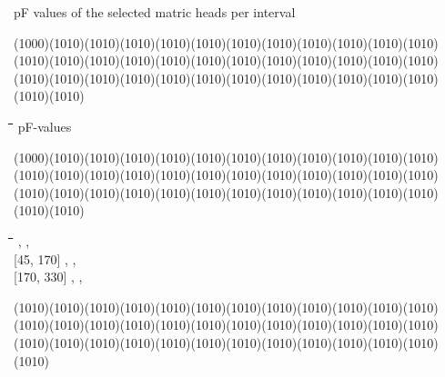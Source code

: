 \documentclass[11pt]{article}
\begin{document}
\begin{indenting}{2.54cm}
pF values of the selected matric heads per interval
\end{indenting}
\GrBox(1000)\GrBox(1010)\GrBox(1010)\GrBox(1010)\GrBox(1010)\GrBox(1010)\GrBox(1010)\GrBox(1010)\GrBox(1010)\GrBox(1010)\GrBox(1010)\GrBox(1010)\GrBox(1010)\GrBox(1010)\GrBox(1010)\GrBox(1010)\GrBox(1010)\GrBox(1010)\GrBox(1010)\GrBox(1010)\GrBox(1010)\GrBox(1010)\GrBox(1010)\GrBox(1010)\GrBox(1010)\GrBox(1010)\GrBox(1010)\GrBox(1010)\GrBox(1010)\GrBox(1010)\GrBox(1010)\GrBox(1010)\GrBox(1010)\GrBox(1010)\GrBox(1010)\GrBox(1010)\GrBox(1010)\GrBox(1010)\nwln
\begin{tabbing}
\hspace{1.27cm}\=\hspace{1.27cm}\=\hspace{1.27cm}\=\hspace{1.27cm}\=%
\hspace{1.27cm}\=\hspace{1.27cm}\=\hspace{1.27cm}\=\hspace{1.27cm}\=%
\hspace{1.27cm}\=\hspace{1.27cm}\=\kill
\>\> \> \> \> \> pF-values
\end{tabbing}
\GrBox(1000)\GrBox(1010)\GrBox(1010)\GrBox(1010)\GrBox(1010)\GrBox(1010)\GrBox(1010)\GrBox(1010)\GrBox(1010)\GrBox(1010)\GrBox(1010)\GrBox(1010)\GrBox(1010)\GrBox(1010)\GrBox(1010)\GrBox(1010)\GrBox(1010)\GrBox(1010)\GrBox(1010)\GrBox(1010)\GrBox(1010)\GrBox(1010)\GrBox(1010)\GrBox(1010)\GrBox(1010)\GrBox(1010)\GrBox(1010)\GrBox(1010)\GrBox(1010)\GrBox(1010)\GrBox(1010)\GrBox(1010)\GrBox(1010)\GrBox(1010)\GrBox(1010)\GrBox(1010)\GrBox(1010)\GrBox(1010)\nwln
\begin{tabbing}
\hspace{1.27cm}\=\hspace{1.27cm}\=\hspace{1.27cm}\=\hspace{1.27cm}\=%
\hspace{1.27cm}\=\hspace{1.27cm}\=\hspace{1.27cm}\=\hspace{1.27cm}\=%
\hspace{1.27cm}\=\hspace{1.27cm}\=\kill
[0, 45]\> \> ,\> \>  , \> \>     \\
{}[45, 170]\> \> , \> \> ,\> \>      \\
{}[170, 330]\> \> ,\> \>  , \> \>     
\end{tabbing}
\GrBox(1010)\GrBox(1010)\GrBox(1010)\GrBox(1010)\GrBox(1010)\GrBox(1010)\GrBox(1010)\GrBox(1010)\GrBox(1010)\GrBox(1010)\GrBox(1010)\GrBox(1010)\GrBox(1010)\GrBox(1010)\GrBox(1010)\GrBox(1010)\GrBox(1010)\GrBox(1010)\GrBox(1010)\GrBox(1010)\GrBox(1010)\GrBox(1010)\GrBox(1010)\GrBox(1010)\GrBox(1010)\GrBox(1010)\GrBox(1010)\GrBox(1010)\GrBox(1010)\GrBox(1010)\GrBox(1010)\GrBox(1010)\GrBox(1010)\GrBox(1010)\GrBox(1010)\GrBox(1010)\GrBox(1010)
\end{document}
